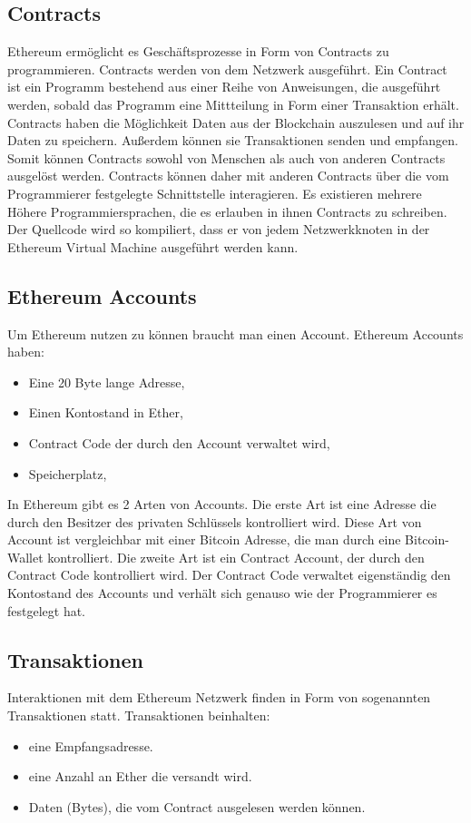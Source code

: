 \subsection{Contracts}
Ethereum ermöglicht es Geschäftsprozesse in Form von Contracts zu programmieren. Contracts werden von dem Netzwerk ausgeführt. Ein Contract ist ein Programm bestehend aus einer Reihe von Anweisungen, die ausgeführt werden, sobald das Programm eine Mittteilung in Form einer Transaktion erhält. Contracts haben die Möglichkeit Daten aus der Blockchain auszulesen und auf ihr Daten zu speichern. Außerdem können sie Transaktionen senden und empfangen. Somit können Contracts sowohl von Menschen als auch von anderen Contracts ausgelöst werden. Contracts können daher mit anderen Contracts über die vom Programmierer festgelegte Schnittstelle interagieren. Es existieren mehrere Höhere Programmiersprachen, die es erlauben in ihnen Contracts zu schreiben. Der Quellcode wird so kompiliert, dass er von jedem Netzwerkknoten in der Ethereum Virtual Machine ausgeführt werden kann.
\subsection{Ethereum Accounts}
Um Ethereum nutzen zu können braucht man einen Account. Ethereum Accounts haben:\\
\begin{itemize}
\item Eine 20 Byte lange Adresse,
\item Einen Kontostand in Ether,
\item Contract Code der durch den Account verwaltet wird,
\item Speicherplatz,
\end{itemize} In Ethereum gibt es 2 Arten von Accounts. Die erste Art ist eine Adresse die durch den Besitzer des privaten Schlüssels kontrolliert wird. Diese Art von Account ist vergleichbar mit einer Bitcoin Adresse, die man durch eine Bitcoin-Wallet kontrolliert. Die zweite Art ist ein Contract Account, der durch den Contract Code kontrolliert wird. Der Contract Code verwaltet eigenständig den Kontostand des Accounts und verhält sich genauso wie der Programmierer es festgelegt hat.
\subsection{Transaktionen}
Interaktionen mit dem Ethereum Netzwerk finden in Form von sogenannten Transaktionen statt. Transaktionen beinhalten:
\begin{itemize}
\item eine Empfangsadresse.
\item eine Anzahl an Ether die versandt wird.
\item Daten (Bytes), die vom Contract ausgelesen werden können.
\end{itemize}

